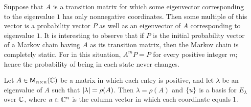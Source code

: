 \begin{note}
  Suppose that \(A\) is a transition matrix for which some eigenvector corresponding to the eigenvalue \(1\) has only nonnegative coordinates.
  Then some multiple of this vector is a probability vector \(P\) as well as an eigenvector of \(A\) corresponding to eigenvalue \(1\).
  It is interesting to observe that if \(P\) is the initial probability vector of a Markov chain having \(A\) as its transition matrix, then the Markov chain is completely static.
  For in this situation, \(A^m P = P\) for every positive integer \(m\);
  hence the probability of being in each state never changes.
\end{note}

\begin{thm}\label{5.18}
  Let \(A \in \mathsf{M}_{{n} \times n}({\mathbb{C}})\) be a matrix in which each entry is positive, and let \(\lambda\) be an eigenvalue of \(A\) such that \(\left\lvert\lambda\right\rvert = \rho(A)\).
  Then \(\lambda = \rho(A)\) and \(\left\lbrace u\right\rbrace\) is a basis for \(E_{\lambda}\) over \(\mathbb{C}\), where \(u \in \mathbb{C}^n\) is the column vector in which each coordinate equals \(1\).
\end{thm}

